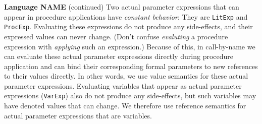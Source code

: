 \begin{minipage}[t]{\sw}
\slidenumber
\LARGE
{\bf Language NAME} (continued)\exx
Two actual parameter expressions 
that can appear in procedure applications
have {\em constant behavior}:
They are \verb'LitExp' and \verb'ProcExp'.
Evaluating these expressions do not produce any side-effects,
and their expressed values can never change.
(Don't confuse {\em evaluting} a procedure expression
with {\em applying} such an expression.)
Because of this, in call-by-name
we can evaluate these actual parameter expressions
directly during procedure application
and can bind their corresponding formal parameters
to new references to their values directly.
In other words, we use value semantics
for these actual parameter expressions.\exx
Evaluating variables that appear as actual parameter expressions
(\verb'VarExp') also do not produce any side-effects,
but such variables may have denoted values that can change.
We therefore use reference semantics
for actual parameter expressions that are variables.
\end{minipage}
\clearpage
